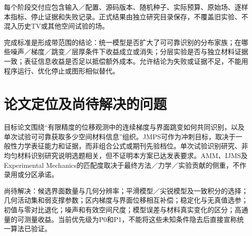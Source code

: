\documentclass[11pt,a4paper]{ctexart}
\begin{document}
每个阶段交付应包含输入／配置、源码版本、随机种子、实际预算、原始场、逐样本指标、停止证据和失败记录。正式结果由独立研究目录保存，不覆盖旧实验、不混入历史TV或其他空间试验的场。

完成标准是形成带范围的结论：统一模型是否扩大了可可靠识别的分布家族；在哪些噪声／梯度／跳变／层厚条件下收益成立或消失；分层实验是否与独立材料证据一致；表征信息收益是否足以抵偿额外成本。允许结论为失败或证据不足，不能用程序运行、优化停止或图形相似替代。

\section{论文定位及尚待解决的问题}
目标论文围绕“有限精度的位移观测中的连续梯度与界面跳变如何共同识别，以及单次试验可可靠获取多少空间材料信息”组织。JMPS可作为冲刺目标，取决于一般性力学表征能力和证据，而非组合公式或期刊先验档位。单次试验识别研究\cite{boddapati2023}、非均匀材料识别研究\cite{salahshoor2026}说明选题相关，但不证明本方案已达发表要求。AMM、IJMS及Experimental Mechanics的匹配度取决于最终方法／力学／实验贡献的侧重，不作录用或分区承诺。

尚待解决：候选界面数量与几何分辨率；平滑模型／尖锐模型及一致积分的选择；几何活动集和弱支撑参数；区内梯度与界面位移相互补偿；稳定化与无真值选参；初值与零对比退化；噪声和有效空间尺度；模型误差与材料真实变化的区分；高通量的可测量收益。当前优先级为P0和P1，不能将这些未知条件隐去后直接宣称统一算法已验证。
\end{document}
